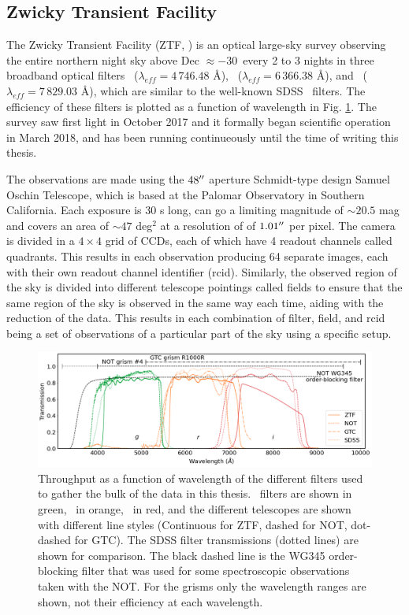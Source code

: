 \documentclass[a4paper,oneside,12pt, class=Latex/Classes/PhDthesisPSnPDF, crop=false]{standalone}
\begin{document}
\subsection{Zwicky Transient Facility}
\label{ZTF}
The Zwicky Transient Facility (ZTF, \citealt{ZTF_Surveys_Scheduler, ZTF_overview_and_1st_results, ZTF_Science_Objectives, ZTF_Instrumentation, ZTF_Observing_System}) is an optical large-sky survey observing the entire northern night sky above Dec $\approx -30$\degree\ every 2 to 3 nights in three broadband optical filters \ztfg~($\lambda_{eff} = 4\,746.48$ \AA), \ztfr~($\lambda_{eff} = 6\,366.38$ \AA), and \ztfi~($\lambda_{eff} = 7\,829.03$ \AA), which are similar to the well-known SDSS \ztfg\ztfr\ztfi\ filters. The efficiency of these filters is plotted as a function of wavelength in Fig. \ref{Optical_elements_plot}. The survey saw first light in October 2017 and it formally began scientific operation in March 2018, and has been running continueously until the time of writing this thesis.

The observations are made using the $48^{\prime\prime}$ aperture Schmidt-type design Samuel Oschin Telescope, which is based at the Palomar Observatory in Southern California. Each exposure is 30 s long, can go a limiting magnitude of $\sim20.5$ mag and covers an area of $\sim47$ deg$^2$ at a resolution of of $1.01^{\prime\prime}$ per pixel. The camera is divided in a $4\times4$ grid of CCDs, each of which have 4 readout channels called quadrants. This results in each observation producing 64 separate images, each with their own readout channel identifier (rcid). Similarly, the observed region of the sky is divided into different telescope pointings called fields to ensure that the same region of the sky is observed in the same way each time, aiding with the reduction of the data. This results in each combination of filter, field, and rcid being a set of observations of a particular part of the sky using a specific setup.

\begin{figure}
    \centering
    \includegraphics[width=\textwidth]{../Images/chapter_2/transmissions.png}
    \caption{Throughput as a function of wavelength of the different filters used to gather the bulk of the data in this thesis. \ztfg\ filters are shown in green, \ztfr\ in orange, \ztfi\ in red, and the different telescopes are shown with different line styles (Continuous for ZTF, dashed for NOT, dot-dashed for GTC). The SDSS filter transmissions (dotted lines) are shown for comparison. The black dashed line is the WG345 order-blocking filter that was used for some spectroscopic observations taken with the NOT. For the grisms only the wavelength ranges are shown, not their efficiency at each wavelength.}
    \label{Optical_elements_plot}
\end{figure}
\end{document}
